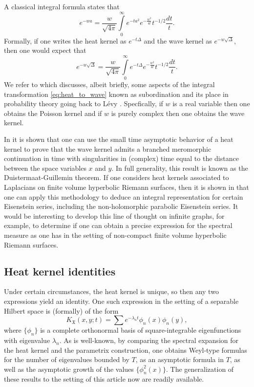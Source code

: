 \documentclass[11pt,reqno]{amsart}
\theoremstyle{remark}
\theoremstyle{definition}
\numberwithin{theorem}{section} \numberwithin{equation}{section}
\newcommand{\X}{\mathfrak{X}}
\begin{document}
A classical integral formula states that
$$
e^{-wa} = \frac{w}{\sqrt{4\pi}}\int\limits_{0}^{\infty}e^{-ta^2}e^{-\frac{w^{2}}{4t}}t^{-1/2}\frac{dt}{t}.
$$
Formally, if one writes the heat kernel as $e^{-t\Delta}$ and the wave kernel as $e^{-w\sqrt{\Delta}}$, then
one would expect that
\begin{equation}\label{eq:heat_to_wave}
e^{-w\sqrt{\Delta}} = \frac{w}{\sqrt{4\pi}}\int\limits_{0}^{\infty}e^{-t\Delta}e^{-\frac{w^{2}}{4t}}t^{-1/2}\frac{dt}{t}.
\end{equation}
We refer to \cite{JL03} which discusses, albeit briefly, some aspects of the integral transformation \eqref{eq:heat_to_wave}
known as subordination and its place in probability theory going back to L\'evy \cite{Le39}.  Specfically, if
$w$ is a real variable then one obtains the Poisson kernel and if $w$ is purely complex then one obtains the wave kernel.

In \cite{JL03} it is shown that one can use the small time asymptotic behavior of a heat kernel to prove that the wave
kernel admits a branched meromorphic continuation in time with singularities in (complex) time equal to the distance
between the space variables $x$ and $y$.  In full generality, this result is known as the Duistermaat-Guillemin theorem.
If one considers heat kernels associated to Laplacians on finite volume hyperbolic Riemann surfaces, then it is shown
in \cite{JvPS16} that one can apply this methodology to deduce an integral representation for certain Eisenstein series, including the non-holomorphic
parabolic Eisenstein series.  It would be interesting to develop this line of thought on infinite graphs, for example,
to determine if one can obtain a precise expression for the spectral measure as one has in the setting of non-compact
finite volume hyperbolic Riemann surfaces.


\subsection{Heat kernel identities}\label{sec:heat_kernel_uniqueness}

Under certain circumstances, the heat kernel is unique, so then any two expressions yield an identity.
One such expression in the setting of a separable Hilbert space is (formally) of the form
$$
K_{\X}(x,y;t) = \sum e^{-\lambda_{n}t}\phi_{n}(x)\phi_{n}(y),
$$
where $\{\phi_{n}\}$ is a complete orthonormal basis of square-integrable eigenfunctions with
eigenvalue $\lambda_{n}$.  As is well-known, by comparing the spectral expansion for the heat kernel
and the parametrix construction, one obtains Weyl-type formulas for the number of eigenvalues bounded
by $T$, as an asymptotic formula in $T$, as well as the asymptotic growth of the values $\{\phi_{n}^{2}(x)\}$.
The generalization of these results to the setting of this article now are readily available.
\end{document}
